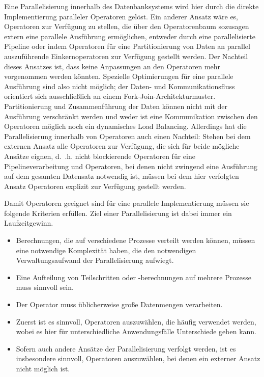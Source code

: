 \documentclass[a4paper,12pt,twoside]{article}
\begin{document}
Eine Parallelisierung innerhalb des Datenbanksystems wird hier durch die direkte Implementierung paralleler Operatoren gelöst. Ein anderer Ansatz wäre es, Operatoren zur Verfügung zu stellen, die über den Operatorenbaum sozusagen extern eine parallele Ausführung ermöglichen, entweder durch eine parallelisierte Pipeline oder indem Operatoren für eine Partitionierung von Daten an parallel auszuführende Einkernoperatoren zur Verfügung gestellt werden. Der Nachteil dieses Ansatzes ist, dass keine Anpassungen an den Operatoren mehr vorgenommen werden könnten. Spezielle Optimierungen für eine parallele Ausführung sind also nicht möglich; der Daten- und Kommunikationsfluss orientiert sich ausschließlich an einem Fork-Join-Architekturmuster. Partitionierung und Zusammenführung der Daten können nicht mit der Ausführung verschränkt werden und weder ist eine Kommunikation zwischen den Operatoren möglich noch ein dynamisches Load Balancing. Allerdings hat die Parallelisierung innerhalb von Operatoren auch einen Nachteil: Stehen bei dem externen Ansatz alle Operatoren zur Verfügung, die sich für beide mögliche Ansätze eignen, d.~.h. nicht blockierende Operatoren für eine Pipelineverarbeitung und Operatoren, bei denen nicht zwingend eine Ausführung auf dem gesamten Datensatz notwendig ist, müssen bei dem hier verfolgten Ansatz Operatoren explizit zur Verfügung gestellt werden.  

Damit Operatoren geeignet sind für eine parallele Implementierung müssen sie folgende Kriterien erfüllen. Ziel einer Parallelisierung ist dabei immer ein Laufzeitgewinn.

\begin{itemize}
	\item Berechnungen, die auf verschiedene Prozesse verteilt werden können, müssen eine notwendige Komplexität haben, die den notwendigen Verwaltungsaufwand der Parallelisierung aufwiegt.
	\item Eine Aufteilung von Teilschritten oder -berechnungen auf mehrere Prozesse muss sinnvoll sein.
	\item Der Operator muss üblicherweise große Datenmengen verarbeiten.
	\item Zuerst ist es sinnvoll, Operatoren auszuwählen, die häufig verwendet werden, wobei es hier für unterschiedliche Anwendungsfälle Unterschiede geben kann.
	\item Sofern auch andere Ansätze der Parallelisierung verfolgt werden, ist es insbesondere sinnvoll, Operatoren auszuwählen, bei denen ein externer Ansatz nicht möglich ist.
\end{itemize}
\end{document}
